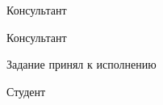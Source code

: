 \intervalS%

Консультант  \uline{\hspace*{0.1\textheight}\ConsultantExtra}


\intervalS%

Консультант  \uline{\hspace*{0.1\textheight}\ConsultantExtraTwo}


\intervalS%


Задание принял к исполнению \uline{\thesisStartDate}

\intervalS%

Студент \uline{\hspace*{0.1\textheight}  \Author}



